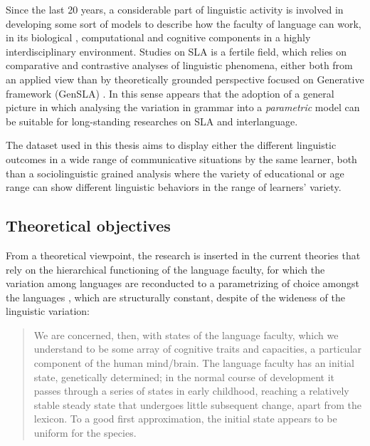 \documentclass[
  a4paper,
  twoside,
  12pt,
  chapterprefix=false,
  bibliography=totocnumbered,
  listof=flat]{scrbook}
\begin{document}
Since the last 20 years, a considerable part of linguistic activity is involved in developing some sort of models to describe how the faculty of language can work, in its biological \citep{hcf2002}, computational \citep{fodor2001} and cognitive components in a highly interdisciplinary environment.
Studies on SLA is a fertile field, which relies on comparative and contrastive analyses of linguistic phenomena, either both from an applied view \citep{ellis1994} than by theoretically grounded perspective focused on Generative framework (GenSLA) \citep{guasti2002, hawkins2001, rothmanslabakova2017, sorace2011}.
In this sense appears that the adoption of a general picture in which analysing the variation in grammar into a \emph{parametric} model \citep{chomsky1995} can be suitable for long-standing researches on SLA and interlanguage.

The dataset used in this thesis aims to display either the different linguistic outcomes in a wide range of communicative situations by the same learner, both than a sociolinguistic grained analysis where the variety of educational or age range can show different linguistic behaviors in the range of learners' variety.

\hypertarget{theoretical-objectives}{%
\subsection{Theoretical objectives}\label{theoretical-objectives}}

From a theoretical viewpoint, the research is inserted in the current theories that rely on the hierarchical functioning of the language faculty, for which the variation among languages are reconducted to a parametrizing of choice amongst the languages \citep{adger2013, chomsky1995, chomsky1998, chomsky2013, chomsky2015, rizzi2013}, which are structurally constant, despite of the wideness of the linguistic variation:

\begin{quote}
We are concerned, then, with states of the language faculty, which we understand to be some array of cognitive traits and capacities, a particular component of the human mind/brain. The language faculty has an initial state, genetically determined; in the normal course of development it passes through a series of states in early childhood, reaching a relatively stable steady state that undergoes little subsequent change, apart from the lexicon. To a good first approximation, the initial state appears to be uniform for the species.
\citep{chomsky1995}
\end{quote}
\end{document}
